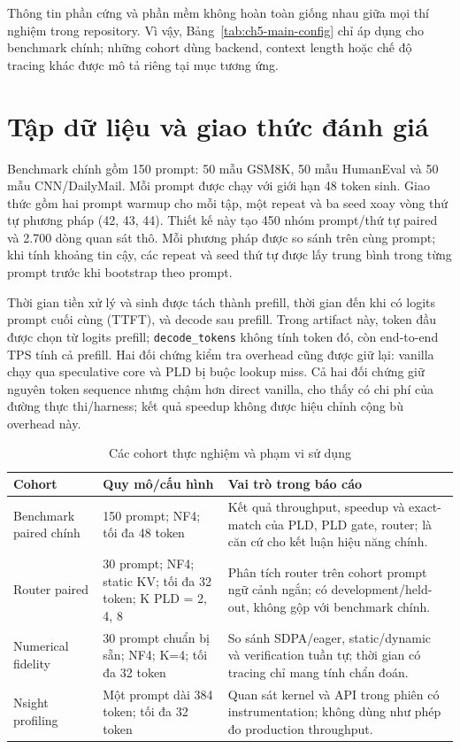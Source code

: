 Thông tin phần cứng và phần mềm không hoàn toàn giống nhau giữa mọi thí nghiệm trong repository. Vì vậy, Bảng~\ref{tab:ch5-main-config} chỉ áp dụng cho benchmark chính; những cohort dùng backend, context length hoặc chế độ tracing khác được mô tả riêng tại mục tương ứng.

\section{Tập dữ liệu và giao thức đánh giá}

Benchmark chính gồm 150 prompt: 50 mẫu GSM8K, 50 mẫu HumanEval và 50 mẫu CNN/\allowbreak DailyMail. Mỗi prompt được chạy với giới hạn 48 token sinh. Giao thức gồm hai prompt warmup cho mỗi tập, một repeat và ba seed xoay vòng thứ tự phương pháp (42, 43, 44). Thiết kế này tạo 450 nhóm prompt/thứ tự paired và 2.700 dòng quan sát thô. Mỗi phương pháp được so sánh trên cùng prompt; khi tính khoảng tin cậy, các repeat và seed thứ tự được lấy trung bình trong từng prompt trước khi bootstrap theo prompt.

Thời gian tiền xử lý và sinh được tách thành prefill, thời gian đến khi có logits prompt cuối cùng (TTFT), và decode sau prefill. Trong artifact này, token đầu được chọn từ logits prefill; \texttt{decode\_tokens} không tính token đó, còn end-to-end TPS tính cả prefill. Hai đối chứng kiểm tra overhead cũng được giữ lại: vanilla chạy qua speculative core và PLD bị buộc lookup miss. Cả hai đối chứng giữ nguyên token sequence nhưng chậm hơn direct vanilla, cho thấy có chi phí của đường thực thi/harness; kết quả speedup không được hiệu chỉnh cộng bù overhead này.

\begin{table}[htbp]
\centering
\small
\caption{Các cohort thực nghiệm và phạm vi sử dụng}
\label{tab:ch5-cohorts}
\begin{tabularx}{\textwidth}{@{}p{3.1cm}p{3.3cm}X@{}}
\toprule
\textbf{Cohort} & \textbf{Quy mô/cấu hình} & \textbf{Vai trò trong báo cáo} \\
\midrule
Benchmark paired chính & 150 prompt; NF4; tối đa 48 token & Kết quả throughput, speedup và exact-match của PLD, PLD gate, router; là căn cứ cho kết luận hiệu năng chính. \\
Router paired & 30 prompt; NF4; static KV; tối đa 32 token; K PLD = 2, 4, 8 & Phân tích router trên cohort prompt ngữ cảnh ngắn; có development/held-out, không gộp với benchmark chính. \\
Numerical fidelity & 30 prompt chuẩn bị sẵn; NF4; K=4; tối đa 32 token & So sánh SDPA/eager, static/dynamic và verification tuần tự; thời gian có tracing chỉ mang tính chẩn đoán. \\
Nsight profiling & Một prompt dài 384 token; tối đa 32 token & Quan sát kernel và API trong phiên có instrumentation; không dùng như phép đo production throughput. \\
\bottomrule
\end{tabularx}
\end{table}

